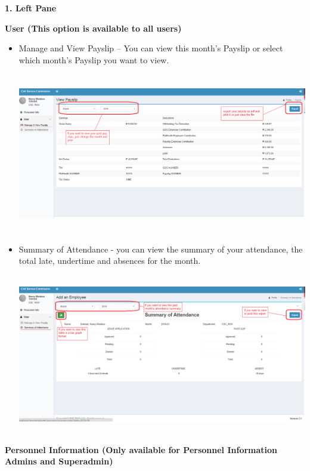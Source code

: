 \noindent
\textbf{ 1. Left Pane \\}

\noindent \textbf{User (This option is available to all users) }
\begin{itemize}
	\item Manage and View Payslip – You can view this month’s Payslip or select which month’s Payslip you want to view. \\
	\begin{center}
		\includegraphics[width=15cm,height=7cm]{image/viewPaySlip.png}
	\end{center}
	
	
	\item Summary of Attendance - you can view the summary of your attendance, the total late, undertime and absences for the month. \\
	\begin{center}
		\includegraphics[width=15cm,height=7cm]{image/summaryOfAttendance.png}
	\end{center}
	
\end{itemize}
\newpage
\noindent
\textbf{Personnel Information (Only available for Personnel Information Admins and Superadmin) \\}

